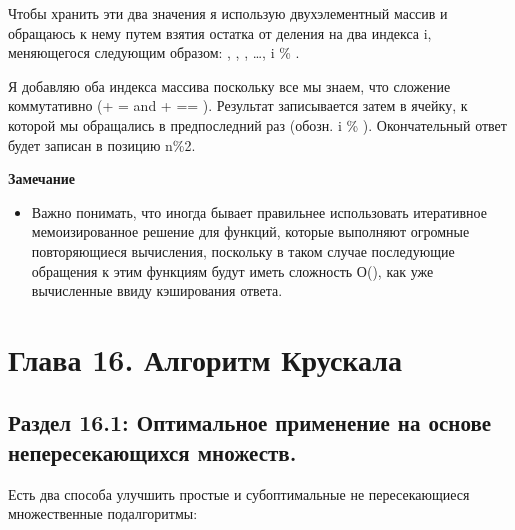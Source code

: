 \vspace{\baselineskip}
Чтобы хранить эти два значения я использую двухэлементный массив и обращаюсь к нему путем взятия остатка от деления на два индекса i, меняющегося следующим образом: , , , \ldots, i \% .

\vspace{\baselineskip}
Я добавляю оба индекса массива поскольку все мы знаем, что сложение коммутативно (+  =  and  +  == ). Результат записывается затем в ячейку, к которой мы обращались в предпоследний раз (обозн. i \% ).  Окончательный ответ будет записан в позицию n\%2.

\vspace{\baselineskip}
\textbf{Замечание}

\vspace{\baselineskip}
\begin{itemize}
  \item Важно понимать, что иногда бывает правильнее использовать итеративное мемоизированное решение для функций, которые выполняют огромные повторяющиеся вычисления, поскольку в таком случае последующие обращения к этим функциям будут иметь сложность О(), как уже вычисленные ввиду  кэширования ответа.
\end{itemize}

\chapter*{Глава 16. Алгоритм Крускала}

\vspace{\baselineskip}
\section*{Раздел 16.1: Оптимальное применение на основе непересекающихся множеств.}

\vspace{\baselineskip}
Есть два способа улучшить простые и субоптимальные не пересекающиеся множественные подалгоритмы:

